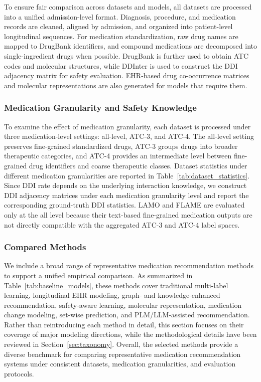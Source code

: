 \documentclass[manuscript,review]{acmart}
\begin{document}
To ensure fair comparison across datasets and models, all datasets are processed into a unified admission-level format. Diagnosis, procedure, and medication records are cleaned, aligned by admission, and organized into patient-level longitudinal sequences. For medication standardization, raw drug names are mapped to DrugBank identifiers, and compound medications are decomposed into single-ingredient drugs when possible. DrugBank is further used to obtain ATC codes and molecular structures, while DDInter is used to construct the DDI adjacency matrix for safety evaluation. EHR-based drug co-occurrence matrices and molecular representations are also generated for models that require them.

\subsubsection{Medication Granularity and Safety Knowledge}

To examine the effect of medication granularity, each dataset is processed under three medication-level settings: all-level, ATC-3, and ATC-4. The all-level setting preserves fine-grained standardized drugs, ATC-3 groups drugs into broader therapeutic categories, and ATC-4 provides an intermediate level between fine-grained drug identifiers and coarse therapeutic classes. Dataset statistics under different medication granularities are reported in Table~\ref{tab:dataset_statistics}. Since DDI rate depends on the underlying interaction knowledge, we construct DDI adjacency matrices under each medication granularity level and report the corresponding ground-truth DDI statistics.
LAMO and FLAME are evaluated only at the all level because their text-based fine-grained medication outputs are not directly compatible with the aggregated ATC-3 and ATC-4 label spaces.


\subsubsection{Compared Methods}



We include a broad range of representative medication recommendation methods to support a unified empirical comparison. As summarized in Table~\ref{tab:baseline_models}, these methods cover traditional multi-label learning, longitudinal EHR modeling, graph- and knowledge-enhanced recommendation, safety-aware learning, molecular representation, medication change modeling, set-wise prediction, and PLM/LLM-assisted recommendation. Rather than reintroducing each method in detail, this section focuses on their coverage of major modeling directions, while the methodological details have been reviewed in Section~\ref{sec:taxonomy}. Overall, the selected methods provide a diverse benchmark for comparing representative medication recommendation systems under consistent datasets, medication granularities, and evaluation protocols.
\end{document}
